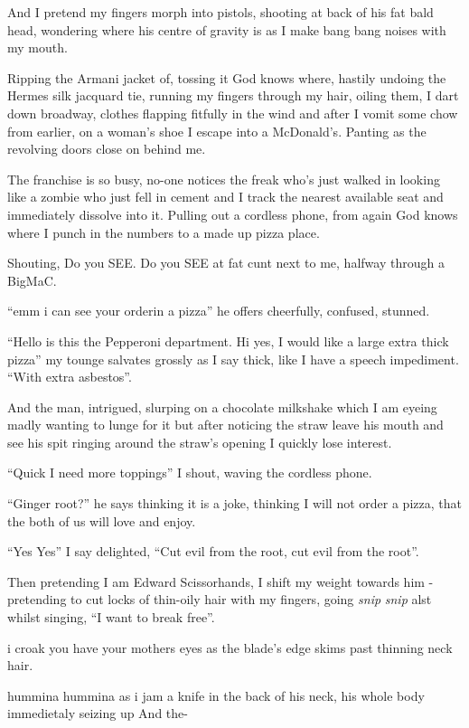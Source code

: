 \documentclass[19pt,openany]{book}
\begin{document}
And I pretend my fingers morph into pistols,
shooting at back of his fat bald head, wondering where
his centre of gravity is as I make bang bang noises
with my  mouth.

Ripping the Armani jacket of,
tossing it God knows where,
hastily undoing the Hermes
silk jacquard tie, running my fingers through my hair, oiling
them, I dart down broadway,
clothes flapping fitfully in the wind and after I vomit some chow
from earlier, on a woman's shoe I escape into a McDonald's.
Panting as the revolving doors close on behind me.

The franchise is so busy, no-one notices the freak
who's just walked in looking like a zombie who
just fell in cement and I track the nearest available
seat and immediately dissolve into it. Pulling
out a cordless phone, from again God knows where
I punch in the numbers to a made up pizza place.

Shouting, Do you SEE. Do you SEE
at fat cunt next to me, halfway through
a BigMaC.

``emm i can see your orderin a pizza''
he offers cheerfully, confused, stunned.

``Hello is this the Pepperoni department. Hi yes, I would like a
large extra thick pizza'' my tounge salvates
grossly as I say thick, like I have a speech impediment. ``With extra asbestos''.

And the man, intrigued, slurping on a chocolate milkshake
which I am eyeing madly wanting to lunge for it but
after noticing the straw leave his mouth and see his spit
ringing around the straw's opening I quickly lose interest.

``Quick I need more toppings''
I shout, waving the cordless phone.

``Ginger root?'' he says thinking it is a joke,
thinking I will not order a pizza, that the
both of us will love and enjoy.

``Yes Yes'' I say delighted, ``Cut evil
from the root, cut evil from the root''.

Then pretending I am Edward Scissorhands,
I shift my weight towards him - pretending
to cut locks of thin-oily hair with my
fingers, going \textit{snip} \textit{snip}
alst whilst singing, ``I want to break free''.

i croak you have your mothers eyes as the blade's edge skims
past thinning neck hair.

hummina hummina as i jam a knife in the back of his neck, his whole body
immedietaly seizing up And the-
\end{document}
